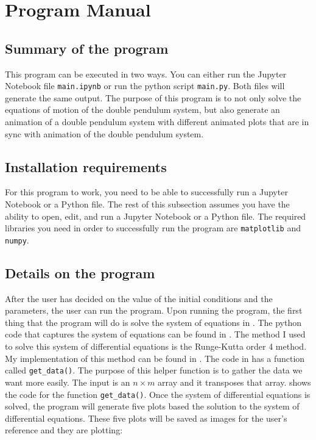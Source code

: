 \section{Program Manual}\label{sec:program-manual}

\subsection{Summary of the program}\label{subsec:summary-of-the-program}
This program can be executed in two ways. You can either run the Jupyter Notebook file \texttt{main.ipynb} or run the python script \texttt{main.py}. Both files will generate the same output. The purpose of this program is to not only solve the equations of motion of the double pendulum system, but also generate an animation of a double pendulum system with different animated plots that are in sync with animation of the double pendulum system.

\subsection{Installation requirements}\label{subsec:installation-requirements}
For this program to work, you need to be able to successfully run a Jupyter Notebook or a Python file. The rest of this subsection assumes you have the ability to open, edit, and run a Jupyter Notebook or a Python file. The required libraries you need in order to successfully run the program are \texttt{matplotlib} and \texttt{numpy}. 

\subsection{Details on the program}\label{subsec:details-on-the-program}
After the user has decided on the value of the initial conditions and the parameters, the user can run the program. Upon running the program, the first thing that the program will do is solve the system of equations in . The python code that captures the system of equations can be found in . The method I used to solve this system of differential equations is the Runge-Kutta order 4 method. My implementation of this method can be found in . The code in  has a function called \verb|get_data()|. The purpose of this helper function is to gather the data we want more easily. The input is an $n \times m$ array and it transposes that array.  shows the code for the function \verb|get_data()|. Once the system of differential equations is solved, the program will generate five plots based the solution to the system of differential equations. These five plots will be saved as images for the user's reference and they are plotting:

